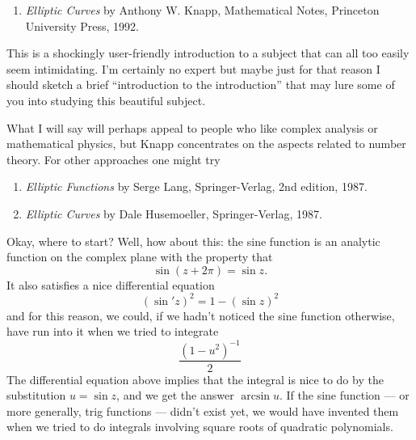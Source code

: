 \documentclass{article}
\def\tightlist{}
\begin{document}
\begin{enumerate}
\def\labelenumi{\arabic{enumi})}
\tightlist
\item
  \emph{Elliptic Curves} by Anthony W. Knapp, Mathematical Notes,
  Princeton University Press, 1992.
\end{enumerate}

This is a shockingly user-friendly introduction to a subject that can
all too easily seem intimidating. I'm certainly no expert but maybe just
for that reason I should sketch a brief ``introduction to the
introduction'' that may lure some of you into studying this beautiful
subject.

What I will say will perhaps appeal to people who like complex analysis
or mathematical physics, but Knapp concentrates on the aspects related
to number theory. For other approaches one might try

\begin{enumerate}
\def\labelenumi{\arabic{enumi})}
\setcounter{enumi}{1}
\item
  \emph{Elliptic Functions} by Serge Lang, Springer-Verlag, 2nd edition,
  1987.
\item
  \emph{Elliptic Curves} by Dale Husemoeller, Springer-Verlag, 1987.
\end{enumerate}

Okay, where to start? Well, how about this: the sine function is an
analytic function on the complex plane with the property that
\[\sin(z + 2\pi) = \sin z.\] It also satisfies a nice differential
equation \[(\sin' z)^2 = 1 -(\sin z)^2\] and for this reason, we could,
if we hadn't noticed the sine function otherwise, have run into it when
we tried to integrate \[\frac{(1 -u^2)^{-1}}{2}\] The differential
equation above implies that the integral is nice to do by the
substitution \(u = \sin z\), and we get the answer \(\arcsin u\). If the
sine function --- or more generally, trig functions --- didn't exist
yet, we would have invented them when we tried to do integrals involving
square roots of quadratic polynomials.
\end{document}
